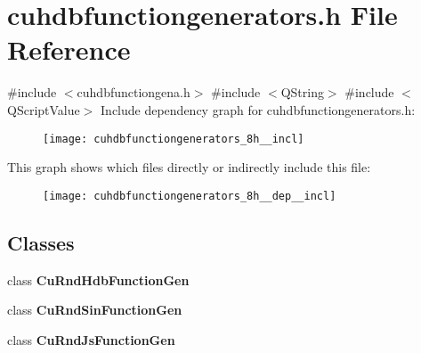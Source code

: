 \section{cuhdbfunctiongenerators.\+h File Reference}
\label{cuhdbfunctiongenerators_8h}
{\ttfamily \#include $<$cuhdbfunctiongena.\+h$>$}\newline
{\ttfamily \#include $<$Q\+String$>$}\newline
{\ttfamily \#include $<$Q\+Script\+Value$>$}\newline
Include dependency graph for cuhdbfunctiongenerators.\+h\+:
\nopagebreak
\begin{figure}[H]
\begin{center}
\leavevmode
\texttt{[image: cuhdbfunctiongenerators\_8h\_\_incl]}
\end{center}
\end{figure}
This graph shows which files directly or indirectly include this file\+:
\nopagebreak
\begin{figure}[H]
\begin{center}
\leavevmode
\texttt{[image: cuhdbfunctiongenerators\_8h\_\_dep\_\_incl]}
\end{center}
\end{figure}
\subsection*{Classes}
\begin{DoxyCompactItemize}
\item 
class \textbf{ Cu\+Rnd\+Hdb\+Function\+Gen}
\item 
class \textbf{ Cu\+Rnd\+Sin\+Function\+Gen}
\item 
class \textbf{ Cu\+Rnd\+Js\+Function\+Gen}
\end{DoxyCompactItemize}
